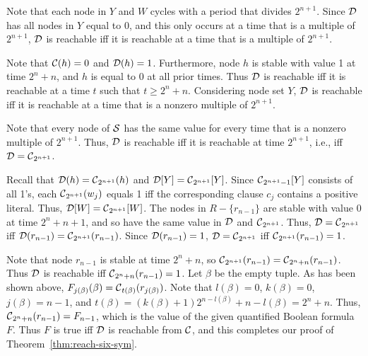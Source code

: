 \smallskip

Note that each node in $Y$ and $W$ cycles with a period that divides $2^{n+1}$.
Since $\mbox{$\mathcal{D}$}$ has all nodes in $Y$ equal to 0, 
and this only occurs at a time that is a multiple of $2^{n+1}$,
$\mbox{$\mathcal{D}$}$ is reachable  iff it is reachable at a time that is a multiple of $2^{n+1}$.

Note that $\mbox{$\mathcal{C}$}(h)=0$ and $\mbox{$\mathcal{D}$}(h)=1$.  Furthermore, node $h$ is
stable with value 1 at time $2^n+n$, and $h$ is equal to 0 at all
prior times.  Thus $\mbox{$\mathcal{D}$}$ is reachable iff it is reachable at a
time $t$ such that $t \geq 2^n+n$.  Considering node set $Y$, $\mbox{$\mathcal{D}$}$
is reachable iff it is reachable  at a time that is a nonzero
multiple of $2^{n+1}$.

Note that every node of $\mbox{$\mathcal{S}$}$ 
has the same value for every time that is a  nonzero multiple of $2^{n+1}$.
Thus, $\mbox{$\mathcal{D}$}$ is reachable  iff it is reachable at time $2^{n+1}$,
i.e., iff $\mbox{$\mathcal{D}$} = \mbox{$\mathcal{C}$}_{2^{n+1}}$.

Recall that $\mbox{$\mathcal{D}$}(h) = \mbox{$\mathcal{C}$}_{2^{n+1}}(h)$ and $\mbox{$\mathcal{D}$}[Y] = \mbox{$\mathcal{C}$}_{2^{n+1}}[Y]$.
Since $\mbox{$\mathcal{C}$}_{2^{n+1}-1}[Y]$ consists of all 1's,
each $\mbox{$\mathcal{C}$}_{2^{n+1}}(w_j)$ equals 1 iff the corresponding clause $c_j$ contains a positive literal.
Thus, $\mbox{$\mathcal{D}$}[W] = \mbox{$\mathcal{C}$}_{2^{n+1}}[W]$.
The nodes in $R - \{r_{n-1}\}$ are stable with value 0 at time $2^n+n+1$,
and so have the same value in $\mbox{$\mathcal{D}$}$ and $\mbox{$\mathcal{C}$}_{2^{n+1}}$.
Thus, $\mbox{$\mathcal{D}$} = \mbox{$\mathcal{C}$}_{2^{n+1}}$ iff $\mbox{$\mathcal{D}$}(r_{n-1}) = \mbox{$\mathcal{C}$}_{2^{n+1}}(r_{n-1})$.
Since $\mbox{$\mathcal{D}$}(r_{n-1}) = 1$, $\mbox{$\mathcal{D}$} = \mbox{$\mathcal{C}$}_{2^{n+1}}$ iff
$\mbox{$\mathcal{C}$}_{2^{n+1}}(r_{n-1}) = 1$.

Note that node $r_{n-1}$ is stable at  time $2^n+n$,
so $ \mbox{$\mathcal{C}$}_{2^{n+1}}(r_{n-1}) = \mbox{$\mathcal{C}$}_{2^n+n}(r_{n-1})$.
Thus  $\mbox{$\mathcal{D}$}$ is reachable iff $\mbox{$\mathcal{C}$}_{2^n+n}(r_{n-1}) = 1$.
Let $\beta$ be the empty tuple.
As has been shown above,
$F_{j(\beta)}(\beta) =\mbox{$\mathcal{C}$}_{t(\beta)}(r_{j(\beta)})$.
Note that $l(\beta) = 0$, $k(\beta) = 0$, $j(\beta) = n-1$,
and $t(\beta) = (k(\beta)+1) 2^{n-l(\beta)} +n -l(\beta) = 2^n+n$. 
Thus, $\mbox{$\mathcal{C}$}_{2^n+n}(r_{n-1}) = F_{n-1}$, which is the value of the given quantified Boolean formula $F$.
Thus $F$ is true iff $\mbox{$\mathcal{D}$}$ is reachable from $\mbox{$\mathcal{C}$}$,
and this completes our proof of Theorem~\ref{thm:reach-six-sym}. \QED

